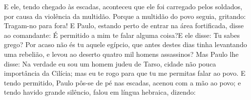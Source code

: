 {E ele, tendo chegado às escadas, aconteceu que ele foi carregado pelos soldados, por causa da violência da multidão.
Porque a multidão do povo
{} seguia, gritando: Tragam-no para fora!
E Paulo, estando perto de entrar na área fortificada, disse ao comandante: É permitido a mim te falar alguma coisa?E ele disse: Tu sabes grego?
Por acaso não és tu aquele egípcio, que antes destes dias tinha levantando uma rebelião, e levou ao deserto quatro mil homens assassinos?
Mas Paulo lhe disse: Na verdade eu sou um homem judeu de Tarso, cidade não pouca importância da Cilícia; mas eu te rogo para que tu me permitas falar ao povo.
E tendo
{} permitido, Paulo pôs-se de pé nas escadas, acenou com a mão ao povo; e tendo havido grande silêncio, falou
{} em língua hebraica, dizendo:

}

